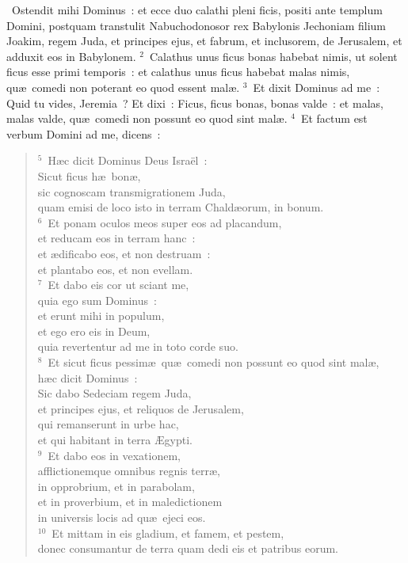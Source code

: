 ~Ostendit mihi Dominus~: et ecce duo calathi pleni ficis, positi ante templum Domini, postquam transtulit Nabuchodonosor rex Babylonis Jechoniam filium Joakim, regem Juda, et principes ejus, et fabrum, et inclusorem, de Jerusalem, et adduxit eos in Babylonem.
${}^{2}$~Calathus unus ficus bonas habebat nimis, ut solent ficus esse primi temporis~: et calathus unus ficus habebat malas nimis, qu\ae\ comedi non poterant eo quod essent mal\ae .
${}^{3}$~Et dixit Dominus ad me~: Quid tu vides, Jeremia~? Et dixi~: Ficus, ficus bonas, bonas valde~: et malas, malas valde, qu\ae\ comedi non possunt eo quod sint mal\ae .
${}^{4}$~Et factum est verbum Domini ad me, dicens~:
\begin{flushleft}\begin{verse}${}^{5}$~H\ae c dicit Dominus Deus Isra\"el~:\\ Sicut ficus h\ae\ bon\ae ,\\ sic cognoscam transmigrationem Juda,\\ quam emisi de loco isto in terram Chald\ae orum, in bonum.\\
${}^{6}$~Et ponam oculos meos super eos ad placandum,\\ et reducam eos in terram hanc~:\\ et \ae dificabo eos, et non destruam~:\\ et plantabo eos, et non evellam.\\
${}^{7}$~Et dabo eis cor ut sciant me,\\ quia ego sum Dominus~:\\ et erunt mihi in populum,\\ et ego ero eis in Deum,\\ quia revertentur ad me in toto corde suo.\\
${}^{8}$~Et sicut ficus pessim\ae\ qu\ae\ comedi non possunt eo quod sint mal\ae ,\\ h\ae c dicit Dominus~:\\ Sic dabo Sedeciam regem Juda,\\ et principes ejus, et reliquos de Jerusalem,\\ qui remanserunt in urbe hac,\\ et qui habitant in terra \AE gypti.\\
${}^{9}$~Et dabo eos in vexationem,\\ afflictionemque omnibus regnis terr\ae ,\\ in opprobrium, et in parabolam,\\ et in proverbium, et in maledictionem\\ in universis locis ad qu\ae\ ejeci eos.\\
${}^{10}$~Et mittam in eis gladium, et famem, et pestem,\\ donec consumantur de terra quam dedi eis et patribus eorum.\end{verse}\end{flushleft}


